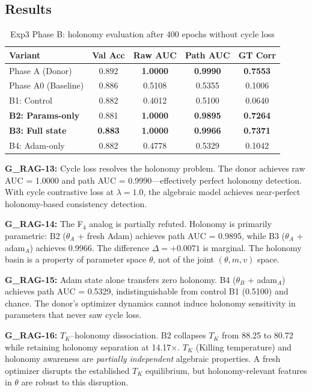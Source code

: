 \documentclass[11pt,letterpaper]{article}
\begin{document}
\subsection{Results}

\begin{table}[H]
\centering
\caption{Exp3 Phase B: holonomy evaluation after 400 epochs without cycle loss}
\begin{tabular}{@{}lcccc@{}}
\toprule
\textbf{Variant} & \textbf{Val Acc} & \textbf{Raw AUC} & \textbf{Path AUC} & \textbf{GT Corr} \\
\midrule
Phase A (Donor) & 0.892 & \textbf{1.0000} & \textbf{0.9990} & \textbf{0.7553} \\
Phase A0 (Baseline) & 0.886 & 0.5108 & 0.5355 & 0.1006 \\
B1: Control & 0.882 & 0.4012 & 0.5100 & 0.0640 \\
\textbf{B2: Params-only} & 0.881 & \textbf{1.0000} & \textbf{0.9895} & \textbf{0.7264} \\
\textbf{B3: Full state} & \textbf{0.883} & \textbf{1.0000} & \textbf{0.9966} & \textbf{0.7371} \\
B4: Adam-only & 0.882 & 0.4778 & 0.5329 & 0.1042 \\
\bottomrule
\end{tabular}
\end{table}

\textbf{G\_RAG-13:} Cycle loss resolves the holonomy problem. The donor achieves raw AUC = 1.0000 and path AUC = 0.9990---effectively perfect holonomy detection. With cycle contrastive loss at $\lambda = 1.0$, the algebraic model achieves near-perfect holonomy-based consistency detection.

\textbf{G\_RAG-14:} The F$_4$ analog is partially refuted. Holonomy is primarily parametric: B2 ($\theta_A$ + fresh Adam) achieves path AUC = 0.9895, while B3 ($\theta_A$ + adam$_A$) achieves 0.9966. The difference $\Delta = +0.0071$ is marginal. The holonomy basin is a property of parameter space $\theta$, not of the joint $(\theta, m, v)$ space.

\textbf{G\_RAG-15:} Adam state alone transfers zero holonomy. B4 ($\theta_B$ + adam$_A$) achieves path AUC = 0.5329, indistinguishable from control B1 (0.5100) and chance. The donor's optimizer dynamics cannot induce holonomy sensitivity in parameters that never saw cycle loss.

\textbf{G\_RAG-16:} $T_K$--holonomy dissociation. B2 collapses $T_K$ from 88.25 to 80.72 while retaining holonomy separation at 14.17$\times$. $T_K$ (Killing temperature) and holonomy awareness are \textit{partially independent} algebraic properties. A fresh optimizer disrupts the established $T_K$ equilibrium, but holonomy-relevant features in $\theta$ are robust to this disruption.
\end{document}

